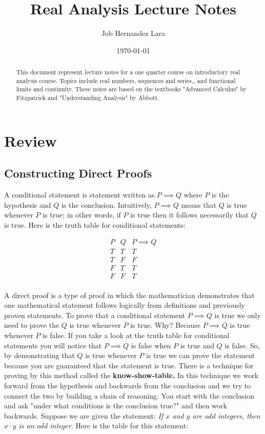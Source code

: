\documentclass[10pt]{article}
\title{Real Analysis Lecture Notes}
\author{Job Hernandez Lara}
\date{\today}
\begin{document}
\maketitle \tableofcontents 


\begin{abstract}
This document represent lecture notes for a one quarter course on introductory real analysis course. Topics include real numbers, sequences and series,, and functional limits and continuity. These notes are based on the textbooks "Advanced Calculus" by Fitzpatrick and "Understanding Analysis" by Abbott. 
\end{abstract}

\section{Review}

\subsection{Constructing Direct Proofs}
A conditional statement is statement written as $P\implies Q$ where $P$ is the hypothesis and $ Q $ is the conclusion. Intuitively, $P \implies Q$ means that $Q$ is true whenever $P$ is true; in other words, if $P$ is true then it follows necessarily that $Q$ is true. Here is the truth table for conditional statements:

\begin{center}
    \[
\begin{array}{r|c|l} 
P & Q & P \implies Q\\
\hline
T & T & T\\
T & F & F\\
F & T & T\\
F & F & T\\
\end{array}
\]
\end{center}
A direct proof is a type of proof in which the mathematician demonstrates that one mathematical statement follows logically from definitions and previously proven statements. To prove that a conditional statement $P \implies Q$ is true we only need to prove the $Q$ is true whenever $P$ is true. Why? Because $P\implies Q$ is true whenever $P$ is false. If you take a look at the truth table for conditional statements you will notice that $P \implies Q$ is false when $P$ is true and $Q$ is false. So, by demonstrating that $Q$ is true whenever $P$ is true we can prove the statement because you are guaranteed that the statement is true. There is a technique for proving by this method called the \textbf{know-show-table.} In this technique we work forward from the hypothesis and backwards from the conclusion and we try to connect the two by building a chain of reasoning. You start with the conclusion and ask "under what conditions is the conclusion true?" and then work backwards. Suppose  we are given the statement: \textit{If $x$ and $y$ are odd integers, then $x \cdot y$ is an odd integer.} Here is the table for this statement:
\end{document}
